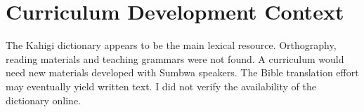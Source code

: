 \documentclass[12pt]{article}
\begin{document}
\section{Curriculum Development Context}
The Kahigi dictionary appears to be the main lexical resource. Orthography, reading materials and teaching grammars were not found. A curriculum would need new materials developed with Sumbwa speakers. The Bible translation effort may eventually yield written text. I did not verify the availability of the dictionary online.
\end{document}
